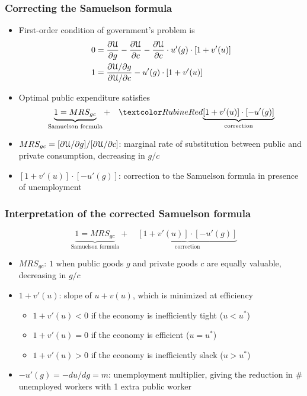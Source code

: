 \documentclass[11pt,aspectratio=169,xcolor={dvipsnames},hyperref={pdftex,pdfpagemode=UseNone,hidelinks,pdfdisplaydoctitle=true},usepdftitle=false]{beamer}
\begin{document}
\begin{frame}
\frametitle{Correcting the Samuelson formula}
\begin{itemize}
\item First-order condition of government's problem is
\begin{align*}
0 &=\pd{\Uc}{g} - \pd{\Uc}{c} - \pd{\Uc}{c}\cdot u'(g) \cdot\bs{1 + v'(u)}\\
1 &=\frac{\pdx{\Uc}{g}}{\pdx{\Uc}{c}} - u'(g) \cdot\bs{1 + v'(u)}
\end{align*}
\item Optimal public expenditure satisfies
\begin{equation*}
\underbrace{1 = MRS_{gc}}_{\text{Samuelson formula}} + \quad \al{\underbrace{[1 + v'(u)] \cdot [-u'(g)]}_{\text{correction}}}
\end{equation*}
\item $MRS_{gc} = [\pdx{\Uc}{g}]/[\pdx{\Uc}{c}]$: marginal rate of substitution between public and private consumption, decreasing in $g/c$
\item $[1 + v'(u)] \cdot [-u'(g)]$: correction to the Samuelson formula in presence of unemployment
\end{itemize}
\end{frame}

\begin{frame}
\frametitle{Interpretation of the corrected Samuelson formula}
\begin{equation*}
\underbrace{1 = MRS_{gc}}_{\text{Samuelson formula}} + \quad \underbrace{[1 + v'(u)] \cdot [-u'(g)]}_{\text{correction}}
\end{equation*}
\begin{itemize}
\item $MRS_{gc}$: $1$ when public goods $g$ and private goods $c$ are equally valuable, decreasing in $g/c$
\item $1 + v'(u)$: slope of $u+v(u)$, which is minimized at efficiency
\begin{itemize}
\item $1 + v'(u) < 0$ if the economy is inefficiently tight ($u<u^*$) 
\item $1 + v'(u) = 0$ if the economy is efficient ($u = u^*$) 
\item $1 + v'(u) > 0$ if the economy is inefficiently slack ($u>u^*$)
\end{itemize}
\item $-u'(g) = -du/dg = m$: unemployment multiplier, giving the reduction in \# unemployed workers with 1 extra public worker
\end{itemize}
\end{frame}
\end{document}
